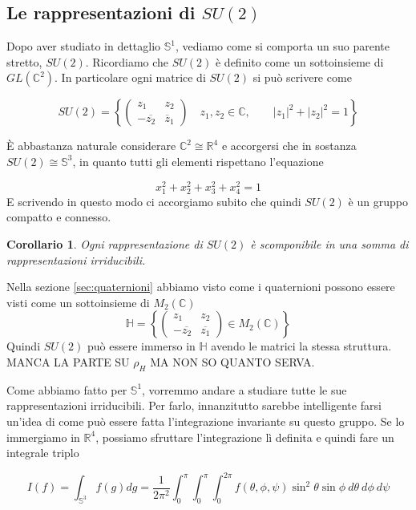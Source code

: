 \documentclass[11pt]{article}
\theoremstyle{plain}
\newtheorem*{cor}{Corollario}
\theoremstyle{definition}
\theoremstyle{remark}
\newcommand{\C}{\mathbb{C}}
\newcommand{\R}{\mathbb{R}}
\newcommand{\HH}{\mathbb{H}}
\newcommand{\dint}{\displaystyle\int}
\begin{document}
\newpage
\subsection{Le rappresentazioni di $SU(2)$}



Dopo aver studiato in dettaglio $\mathbb{S}^1$, vediamo come si comporta un suo parente stretto, $SU(2)$. Ricordiamo che $SU(2)$ è definito come un sottoinsieme di $GL(\C^2)$. In particolare ogni matrice di $SU(2)$ si può scrivere come 

 \[ SU(2) = \left\{  \left(\begin{array}{cc} z_1 & z_2 \\ -\overline{z_2} & \overline z_1 \end{array}\right) \quad z_1, z_2 \in \C  , \qquad |z_1|^2 + |z_2|^2 = 1\right\} \]

 È abbastanza naturale considerare $\C^2 \cong \R^4$ e accorgersi che in sostanza $SU(2) \cong \mathbb{S}^3$, in quanto tutti gli elementi rispettano l'equazione

 \[ x_1 ^2 + x_2^2 + x_3^2 + x_4^2 = 1 \]
E scrivendo in questo modo ci accorgiamo subito che quindi $SU(2)$ è un gruppo compatto e connesso.
\begin{cor} 
Ogni rappresentazione di $SU(2)$ è scomponibile in una somma di rappresentazioni irriducibili.
\end{cor}
Nella sezione \ref{sec:quaternioni} abbiamo visto come i quaternioni possono essere visti come un sottoinsieme di $M_2(\C)$
\[
\mathbb{H}= \left\{\begin{pmatrix}
 z_1& z_2\\ 
 -\overline{z_2}& \overline{z_1} 
\end{pmatrix}\in M_2(\C) \right\}
\]
Quindi $SU(2)$ può essere immerso in $\HH$ avendo le matrici la stessa struttura.\\
 MANCA LA PARTE SU $\rho_H$ MA NON SO QUANTO SERVA.


 
Come abbiamo fatto per $\mathbb{S}^1$, vorremmo andare a studiare tutte le sue rappresentazioni irriducibili. Per farlo, innanzitutto sarebbe intelligente farsi un'idea di come può essere fatta l'integrazione invariante su questo gruppo. Se lo immergiamo in $\R^4$, possiamo sfruttare l'integrazione lì definita e quindi fare un integrale triplo

 \[ I(f) = \dint_{\mathbb{S}^3} f(g) dg = \dfrac{1}{2\pi^2} \dint_0^\pi \dint_0^{\pi} \dint_0 ^{2\pi} f(\theta, \phi, \psi) \sin^2\theta\sin\phi \ d\theta \ d\phi \ d\psi\]
\end{document}
